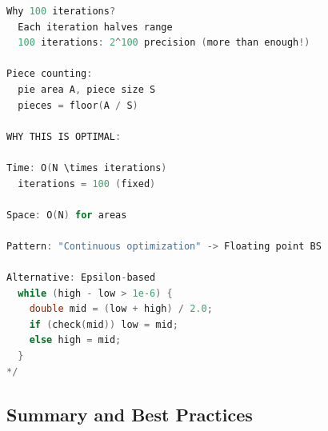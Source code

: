 \documentclass[11pt,a4paper,oneside]{book}
\begin{document}
\begin{lstlisting}[language=C++, caption=Complete Floating Point Solutions]
Why 100 iterations?
  Each iteration halves range
  100 iterations: 2^100 precision (more than enough!)

Piece counting:
  pie area A, piece size S
  pieces = floor(A / S)

WHY THIS IS OPTIMAL:

Time: O(N \times iterations)
  iterations = 100 (fixed)

Space: O(N) for areas

Pattern: "Continuous optimization" -> Floating point BS

Alternative: Epsilon-based
  while (high - low > 1e-6) {
    double mid = (low + high) / 2.0;
    if (check(mid)) low = mid;
    else high = mid;
  }
*/
\end{lstlisting}

\subsection{Summary and Best Practices}
\end{document}
